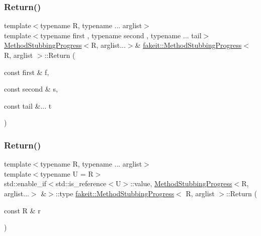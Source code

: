 \mbox{\label{structfakeit_1_1MethodStubbingProgress_ae8417ec5f29f70be1ae914755b05e4db}} 
\subsubsection{\texorpdfstring{Return()}{Return()}\hspace{0.1cm}{\footnotesize\ttfamily [18/45]}}
{\footnotesize\ttfamily template$<$typename R, typename ... arglist$>$ \\
template$<$typename first , typename second , typename ... tail$>$ \\
\mbox{\hyperlink{structfakeit_1_1MethodStubbingProgress}{Method\+Stubbing\+Progress}}$<$R, arglist...$>$\& \mbox{\hyperlink{structfakeit_1_1MethodStubbingProgress}{fakeit\+::\+Method\+Stubbing\+Progress}}$<$ R, arglist $>$\+::Return (\begin{DoxyParamCaption}\item[{const first \&}]{f,  }\item[{const second \&}]{s,  }\item[{const tail \&...}]{t }\end{DoxyParamCaption})\hspace{0.3cm}{\ttfamily [inline]}}

\mbox{\label{structfakeit_1_1MethodStubbingProgress_ab20141c6f552c3aa3399660c520c2ba4}} 
\subsubsection{\texorpdfstring{Return()}{Return()}\hspace{0.1cm}{\footnotesize\ttfamily [19/45]}}
{\footnotesize\ttfamily template$<$typename R, typename ... arglist$>$ \\
template$<$typename U  = R$>$ \\
std\+::enable\+\_\+if$<$std\+::is\+\_\+reference$<$U$>$\+::value, \mbox{\hyperlink{structfakeit_1_1MethodStubbingProgress}{Method\+Stubbing\+Progress}}$<$R, arglist...$>$ \&$>$\+::type \mbox{\hyperlink{structfakeit_1_1MethodStubbingProgress}{fakeit\+::\+Method\+Stubbing\+Progress}}$<$ R, arglist $>$\+::Return (\begin{DoxyParamCaption}\item[{const R \&}]{r }\end{DoxyParamCaption})\hspace{0.3cm}{\ttfamily [inline]}}

